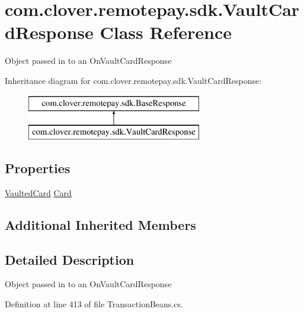 \hypertarget{classcom_1_1clover_1_1remotepay_1_1sdk_1_1_vault_card_response}{}\section{com.\+clover.\+remotepay.\+sdk.\+Vault\+Card\+Response Class Reference}
\label{classcom_1_1clover_1_1remotepay_1_1sdk_1_1_vault_card_response}


Object passed in to an On\+Vault\+Card\+Response  


Inheritance diagram for com.\+clover.\+remotepay.\+sdk.\+Vault\+Card\+Response\+:\begin{figure}[H]
\begin{center}
\leavevmode
\includegraphics[height=2.000000cm]{classcom_1_1clover_1_1remotepay_1_1sdk_1_1_vault_card_response}
\end{center}
\end{figure}
\subsection*{Properties}
\begin{DoxyCompactItemize}
\item 
\hyperlink{classcom_1_1clover_1_1sdk_1_1v3_1_1payments_1_1_vaulted_card}{Vaulted\+Card} \hyperlink{classcom_1_1clover_1_1remotepay_1_1sdk_1_1_vault_card_response_a10711fbd9fff70f8a7f98e45bcaaedbd}{Card}
\end{DoxyCompactItemize}
\subsection*{Additional Inherited Members}


\subsection{Detailed Description}
Object passed in to an On\+Vault\+Card\+Response 



Definition at line 413 of file Transaction\+Beans.\+cs.



